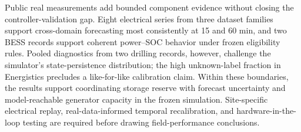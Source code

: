 Public real measurements add bounded component evidence without closing the
controller-validation gap. Eight electrical series from three dataset families
support cross-domain forecasting most consistently at 15 and 60 min, and two
BESS records support coherent power--SOC behavior under frozen eligibility
rules. Pooled diagnostics from two drilling records, however, challenge the
simulator's state-persistence distribution; the high unknown-label fraction in
Energistics precludes a like-for-like calibration claim. Within these
boundaries, the results support
coordinating storage reserve with forecast uncertainty and model-reachable generator
capacity in the frozen simulation. Site-specific electrical replay,
real-data-informed temporal recalibration, and hardware-in-the-loop testing are
required before drawing field-performance conclusions.
